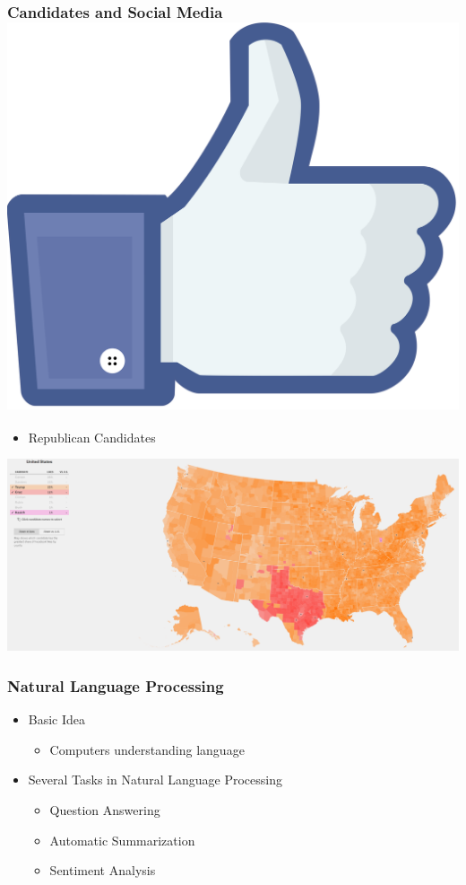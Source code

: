 \documentclass[xcolor=dvipsnames]{beamer}
\begin{document}
\begin{frame}
\frametitle{Candidates and Social Media  \hfill  \includegraphics[scale=.015]{likes.png}}

\begin{itemize}
\item Republican Candidates 
\end{itemize}
\begin{center}

\includegraphics[scale=.14]{repmap.png}
\end{center}
\end{frame}


\begin{frame}
\frametitle{Natural Language Processing}
	\begin{itemize}
		\item Basic Idea
		\begin{itemize}
			\item Computers understanding language
		\end{itemize}
		\pause
		\item Several Tasks in Natural Language Processing
		\begin{itemize}
			\item Question Answering
			\item Automatic Summarization
			\item Sentiment Analysis
		\end{itemize}
	\end{itemize}
\end{frame}
\end{document}
